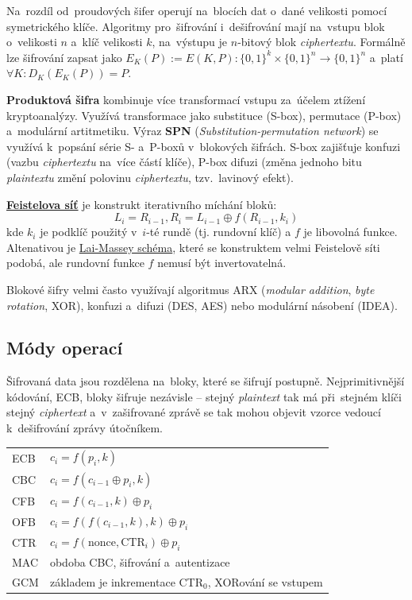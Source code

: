 Na~rozdíl od~proudových šifer operují na~blocích dat o~dané velikosti pomocí symetrického klíče. Algoritmy pro~šifrování i~dešifrování mají na~vstupu blok o~velikosti $n$ a~klíč velikosti $k$, na~výstupu je $n$-bitový blok \emph{ciphertextu}. Formálně lze šifrování zapsat jako $E_K (P) := E(K, P): \{0, 1\}^k \times \{0, 1\}^n \rightarrow \{0, 1\}^n$ a~platí $\forall K: D_K (E_K (P)) = P$.

\textbf{Produktová šifra} kombinuje více transformací vstupu za~účelem ztížení kryptoanalýzy. Využívá transformace jako substituce (S-box), permutace (P-box) a~modulární artitmetiku. Výraz \textbf{SPN} (\emph{Substitution-permutation network}) se využívá k~popsání série S- a~P-boxů v~blokových šifrách. S-box zajišťuje konfuzi (vazbu \emph{ciphertextu} na~více částí klíče), P-box difuzi (změna jednoho bitu \emph{plaintextu} změní polovinu \emph{ciphertextu}, tzv.~lavinový efekt).

\textbf{\href{https://en.wikipedia.org/wiki/Feistel_network}{Feistelova síť}} je konstrukt iterativního míchání bloků: $$L_i = R_{i-1}, R_i = L_{i-1} \oplus f(R_{i-1}, k_i)$$ kde $k_i$ je podklíč použitý v~$i$-té rundě (tj. rundovní klíč) a $f$ je libovolná funkce. Altenativou je \href{https://en.wikipedia.org/wiki/Lai-Massey_scheme}{Lai-Massey schéma}, které se konstruktem velmi Feistelově síti podobá, ale rundovní funkce $f$ nemusí být invertovatelná.


Blokové šifry velmi často využívají algoritmus ARX (\emph{modular addition}, \emph{byte rotation}, XOR), konfuzi a~difuzi (DES, AES) nebo modulární násobení (IDEA).

\subsection{Módy operací}

Šifrovaná data jsou rozdělena na~bloky, které se šifrují postupně. Nejprimitivnější kódování, ECB, bloky šifruje nezávisle -- stejný \emph{plaintext} tak má při~stejném klíči stejný \emph{ciphertext} a~v~zašifrované zprávě se tak mohou objevit vzorce vedoucí k~dešifrování zprávy útočníkem.

\begin{table}[ht]
\centering
\begin{tabular}{p{1cm}|p{14cm}}
ECB & $c_i = f(p_i, k)$ \\
CBC & $c_i = f(c_{i-1} \oplus p_i, k)$ \\
CFB & $c_i = f(c_{i-1}, k) \oplus p_i$ \\
OFB & $c_i = f(f(c_{i-1}, k), k) \oplus p_i$ \\
CTR & $c_i = f(\mathrm{nonce}, \mathrm{CTR}_i) \oplus p_i$ \\
MAC & obdoba CBC, šifrování a~autentizace \\
GCM & základem je inkrementace CTR$_0$, XORování se vstupem \\
\end{tabular}
\end{table}

